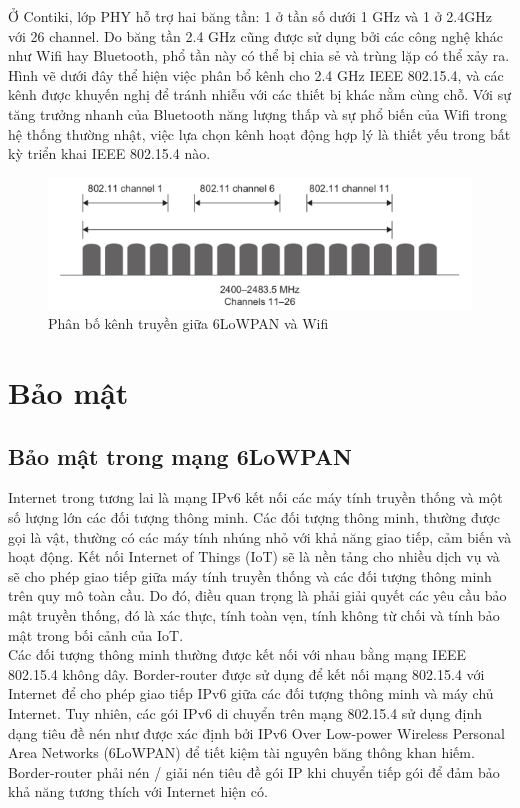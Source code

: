 \documentclass{report}
\begin{document}
Ở Contiki, lớp PHY hỗ trợ hai băng tần: 1 ở tần số dưới 1 GHz và 1 ở 2.4GHz với 26
channel. Do băng tần 2.4 GHz cũng được sử dụng bởi các công nghệ khác như Wifi hay
Bluetooth, phổ tần này có thể bị chia sẻ và trùng lặp có thể xảy ra. Hình vẽ dưới đây
thể hiện việc phân bổ kênh cho 2.4 GHz IEEE 802.15.4, và các kênh được khuyến
nghị để tránh nhiễu với các thiết bị khác nằm cùng chỗ. Với sự tăng trưởng nhanh
của Bluetooth năng lượng thấp và sự phổ biến của Wifi trong hệ thống thường nhật,
việc lựa chọn kênh hoạt động hợp lý là thiết yếu trong bất kỳ triển khai IEEE
802.15.4 nào.
\begin{figure}[h]
	\centering
	\includegraphics[scale = 0.7]{fig32.png}
	\caption{Phân bố kênh truyền giữa 6LoWPAN và Wifi}
	\label{fig:Graph32}
\end{figure}

\section{Bảo mật}
\subsection{Bảo mật trong mạng 6LoWPAN}
Internet trong tương lai là mạng IPv6 kết nối các máy tính truyền thống và một số lượng lớn các đối tượng thông minh. Các đối tượng thông minh, thường được gọi là vật, thường có các máy tính nhúng nhỏ với khả năng giao tiếp, cảm biến và hoạt động. Kết nối Internet of Things (IoT) sẽ là nền tảng cho nhiều dịch vụ và sẽ cho phép giao tiếp giữa máy tính truyền thống và các đối tượng thông minh trên quy mô toàn cầu. Do đó, điều quan trọng là phải giải quyết các yêu cầu bảo mật truyền thống, đó là xác thực, tính toàn vẹn, tính không từ chối và tính bảo mật trong bối cảnh của IoT. \\

Các đối tượng thông minh thường được kết nối với nhau bằng mạng IEEE 802.15.4 không dây. Border-router được sử dụng để kết nối mạng 802.15.4 với Internet để cho phép giao tiếp IPv6 giữa các đối tượng thông minh và máy chủ Internet. Tuy nhiên, các gói IPv6 di chuyển trên mạng 802.15.4 sử dụng định dạng tiêu đề nén như được xác định bởi IPv6 Over Low-power Wireless Personal Area Networks (6LoWPAN) để tiết kiệm tài nguyên băng thông khan hiếm. Border-router phải nén / giải nén tiêu đề gói IP khi chuyển tiếp gói để đảm bảo khả năng tương thích với Internet hiện có. \\
\end{document}
